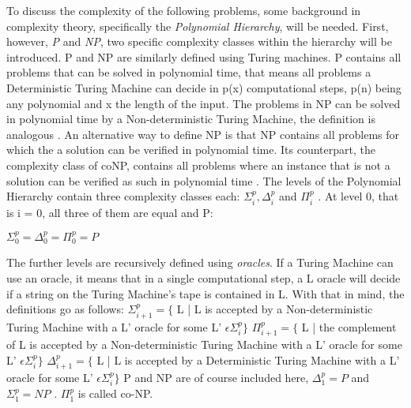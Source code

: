 \documentclass[12pt,a4paper]{article}
\begin{document}
To discuss the complexity of the following problems, some background in complexity theory, specifically the \textit{Polynomial Hierarchy}, will be needed. First, however, \textit{P} and \textit{NP}, two specific complexity classes within the hierarchy will be introduced.
\newline
P and NP are similarly defined using Turing machines. P contains all problems that can be solved in polynomial time, that means all problems a Deterministic Turing Machine can decide in p(x) computational steps, p(n) being any polynomial and x the length of the input. The problems in NP can be solved in polynomial time by a Non-deterministic Turing Machine, the definition is analogous \citep{Davis1983}. An alternative way to define NP is that NP contains all problems for which the a solution can be verified in polynomial time. \citep[p. 59]{Goldreich} Its counterpart, the complexity class of coNP, contains all problems where an instance that is not a solution can be verified as such in polynomial time \citep[p. 154-155]{Goldreich}. 
\newline
The levels of the Polynomial Hierarchy contain three complexity classes each: $\Sigma^p_i, \Delta^p_i$ and $\Pi^p_i$ \citep{Meyer1972}. At level 0, that is i = 0, all three of them are equal and P: 
\begin{center}
	$\Sigma^p_0 = \Delta^p_0 = \Pi^p_0 = P $ \citep{Stockmeyer1976}
\end{center}  
The further levels are recursively defined using \textit{oracles}. If a Turing Machine can use an oracle, it means that in a single computational step, a L oracle will decide if a string on the Turing Machine's tape is contained in L. With that in mind, the definitions go as follows:
\newline
\newline
	$\Sigma^p_{i+1} = \{$ L | L is accepted by a Non-deterministic Turing Machine with a L' oracle for some L' $\epsilon \Sigma^p_i\}$
\newline
\newline
	$\Pi^p_{i+1} = \{$ L | the complement of L is accepted by a Non-deterministic Turing Machine with a L' oracle for some L' $\epsilon \Sigma^p_i\}$
\newline
\newline
	$\Delta^p_{i+1} = \{$ L | L is accepted by a Deterministic Turing Machine with a L' oracle for some L' $\epsilon \Sigma^p_i\}$
\newline 
\newline
P and NP are of course included here, $\Delta^p_1 = P$ and $\Sigma^p_1 = NP$ \citep{Meyer1972}. $\Pi^p_1 $ is called co-NP.
\end{document}
